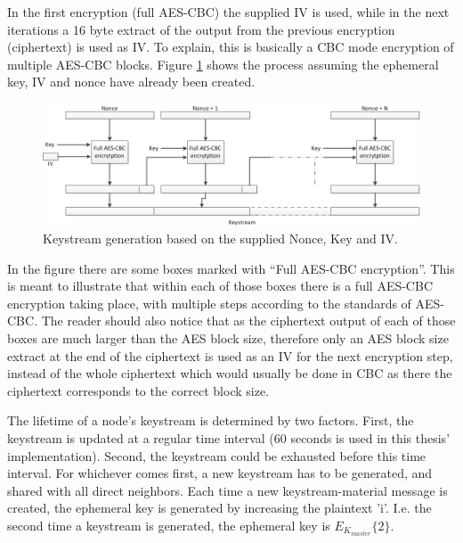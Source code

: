 In the first encryption (full AES-CBC) the supplied \ac{IV} is used, while in
the next iterations a 16 byte extract of the output from the previous encryption
(ciphertext) is used as \ac{IV}. To explain, this is basically a \ac{CBC} mode
encryption of multiple AES-CBC blocks. Figure \ref{fig:keystream_generation}
shows the process assuming the ephemeral key, IV and nonce have already been
created.

\begin{figure}[h]
	\centering
  	\includegraphics[width=\textwidth]{images/keystream_generation.png}
  	\caption{Keystream generation based on the supplied Nonce, Key and IV.}
	\label{fig:keystream_generation}
\end{figure}

In the figure there are some boxes marked with ``Full AES-CBC encryption''. This
is meant to illustrate that within each of those boxes there is a full AES-CBC
encryption taking place, with multiple steps according to the standards of
AES-CBC. The reader should also notice that as the ciphertext output of each of
those boxes are much larger than the AES block size, therefore only an AES block
size extract at the end of the ciphertext is used as an \ac{IV} for the next
encryption step, instead of the whole ciphertext which would usually be done in
CBC as there the ciphertext corresponds to the correct block size.

The lifetime of a node's keystream is determined by two factors. First, the
keystream is updated at a regular time interval (60 seconds is used in this
thesis' implementation). Second, the keystream could be exhausted before this
time interval. For whichever comes first, a new keystream has to be generated,
and shared with all direct neighbors. Each time a new keystream-material message
is created, the ephemeral key is generated by increasing the plaintext 'i'. I.e.
the second time a keystream is generated, the ephemeral key is
$E_{K_{master}}\{2\}$.

